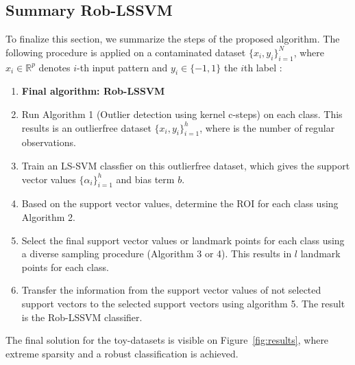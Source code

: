 \documentclass[preprint,12pt]{elsarticle}
\begin{document}
	\subsection{Summary Rob-LSSVM} 
	To finalize this section, we summarize the steps of the proposed algorithm. The following procedure is applied on a contaminated dataset $\{x_i,y_i\}_{i=1}^N$, where $x_i \in \mathbb{R}^{p}$ denotes $i$-th input pattern and $y_i \in \{-1,1\}$ the $i$th label :
	
\begin{enumerate}
	\item[]\textbf{Final algorithm: Rob-LSSVM}
	\item Run Algorithm 1 (Outlier detection using kernel c-steps) on each class. This results is an outlierfree dataset $\{x_i,y_i\}_{i=1}^h$, where is the number of regular observations.
	\item Train an LS-SVM classfier on this outlierfree dataset, which gives the support vector values $\{\alpha_i\}_{i=1}^h$ and bias term $b$. 
	\item Based on the support vector values, determine the ROI for each class using Algorithm 2.
	\item Select the final support vector values or landmark points for each class using a diverse sampling procedure (Algorithm 3 or 4). This results in $l$ landmark points for each class.
	\item Transfer the information from the support vector values of not selected support vectors to the selected support vectors using algorithm 5. The result is the Rob-LSSVM classifier.
\end{enumerate}

The final solution for the toy-datasets is visible on Figure~\ref{fig:results}, where extreme sparsity and a robust classification is achieved.
\end{document}
